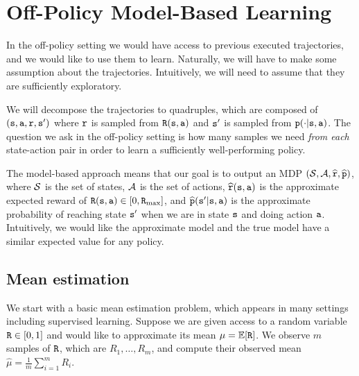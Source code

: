 \section{Off-Policy Model-Based Learning}

In the off-policy setting we would have access to previous executed
trajectories, and we would like to use them to learn. Naturally, we
will have to make some assumption about the trajectories.
Intuitively, we will need to assume that they are sufficiently
exploratory. 

We will decompose the trajectories to quadruples, which are composed
of
$
({\tt s},{\tt a},{\tt r},{\tt s}')
$
where ${\tt r}$ is sampled from ${\tt R}({\tt s},{\tt a})$ and
${\tt s}'$ is sampled from ${\tt p}(\cdot|{\tt s},{\tt a})$.
The question we ask in the off-policy setting is how many samples we need \textit{from each} state-action pair in order to learn a sufficiently well-performing policy.

The model-based approach means that our goal is to output an MDP
$(\mathcal{S},\mathcal{A},\widehat{{\tt r}},\widehat{{\tt p}})$, where $\mathcal{S}$
is the set of states, $\mathcal{A}$ is the set of actions,
$\widehat{{\tt r}}({\tt s},{\tt a})$ is the approximate expected
reward of ${\tt R}({\tt s},{\tt a})\in[0,{\tt R}_{\max }]$, and
$\widehat{{\tt p}}({\tt s}'|{\tt s},{\tt a})$ is the approximate probability
of reaching state ${\tt s}'$ when we are in state ${\tt s}$ and doing
action ${\tt a}$. Intuitively, we would like  the approximate
model and the true model have a similar expected value for any policy.

\subsection{Mean estimation}

We start with a basic mean estimation problem, which appears in many
settings including supervised learning.
Suppose we are given access to a random variable ${\tt R}\in[0,1]$
and would like to approximate its mean $\mu=\mathbb{E}[{\tt R}]$. We
observe $m$ samples of ${\tt R}$, which are $R_1, \ldots, R_m$, and
compute their observed mean $\widehat{\mu}=\frac{1}{m}\sum_{i=1}^m
R_i$.

